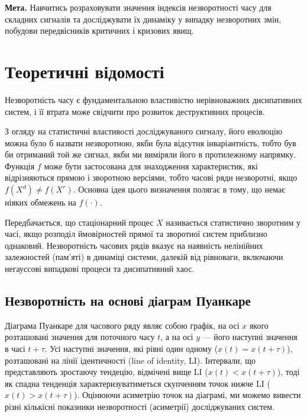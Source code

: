 \documentclass[
  letterpaper,
]{report}
\begin{document}
\textbf{Мета.} Навчитись розраховувати значення індексів незворотності
часу для складних сигналів та досліджувати їх динаміку у випадку
незворотних змін, побудови передвісників критичних і кризових явищ.

\hypertarget{ux442ux435ux43eux440ux435ux442ux438ux447ux43dux456-ux432ux456ux434ux43eux43cux43eux441ux442ux456-7}{%
\section{Теоретичні
відомості}\label{ux442ux435ux43eux440ux435ux442ux438ux447ux43dux456-ux432ux456ux434ux43eux43cux43eux441ux442ux456-7}}

Незворотність часу є фундаментальною властивістю нерівноважних
дисипативних систем, і її втрата може свідчити про розвиток
деструктивних процесів.

З огляду на статистичні властивості досліджуваного сигналу, його
еволюцію можна було б назвати незворотною, якби була відсутня
інваріантність, тобто був би отриманий той же сигнал, якби ми виміряли
його в протилежному напрямку. Функція \(f\) може бути застосована для
знаходження характеристик, які відрізняються прямою і зворотною
версіями, тобто часові ряди незворотні, якщо \(f(X^d) \neq f(X^r)\).
Основна ідея цього визначення полягає в тому, що немає ніяких обмежень
на \(f(\cdot )\).

Передбачається, що стаціонарний процес \(X\) називається статистично
зворотним у часі, якщо розподіл ймовірностей прямої та зворотної систем
приблизно однаковий. Незворотність часових рядів вказує на наявність
нелінійних залежностей (пам'яті) в динаміці системи, далекій від
рівноваги, включаючи негауссові випадкові процеси та дисипативний хаос.

\hypertarget{ux43dux435ux437ux432ux43eux440ux43eux442ux43dux456ux441ux442ux44c-ux43dux430-ux43eux441ux43dux43eux432ux456-ux434ux456ux430ux433ux440ux430ux43c-ux43fux443ux430ux43dux43aux430ux440ux435}{%
\subsection{Незворотність на основі діаграм
Пуанкаре}\label{ux43dux435ux437ux432ux43eux440ux43eux442ux43dux456ux441ux442ux44c-ux43dux430-ux43eux441ux43dux43eux432ux456-ux434ux456ux430ux433ux440ux430ux43c-ux43fux443ux430ux43dux43aux430ux440ux435}}

Діаграма Пуанкаре для часового ряду являє собою графік, на осі \(x\)
якого розташовані значення для поточного часу \(t\), а на осі \(y\) ---
його наступні значення в часі \(t+\tau\). Усі наступні значення, які
рівні один одному (\(x(t) = x(t+\tau)\)), розташовані на лінії
ідентичності (line of identity, LI). Інтервали, що представляють
зростаючу тендецію, відмічені вище LI (\(x(t)<x(t+\tau)\)), тоді як
спадна тенденція характеризуватиметься скупченням точок нижче LI
(\(x(t)>x(t+\tau)\)). Оцінюючи асиметрію точок на діаграмі, ми можемо
вивести різні кількісні показники незворотності (асиметрії)
досліджуваних систем.
\end{document}
